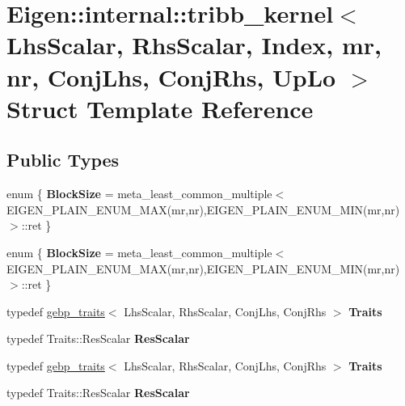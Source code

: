 \hypertarget{struct_eigen_1_1internal_1_1tribb__kernel}{}\section{Eigen\+:\+:internal\+:\+:tribb\+\_\+kernel$<$ Lhs\+Scalar, Rhs\+Scalar, Index, mr, nr, Conj\+Lhs, Conj\+Rhs, Up\+Lo $>$ Struct Template Reference}
\label{struct_eigen_1_1internal_1_1tribb__kernel}
\subsection*{Public Types}
\begin{DoxyCompactItemize}
\item 
\mbox{\label{struct_eigen_1_1internal_1_1tribb__kernel_a37de79324c1a304bdb5a3ef0e651e439}} 
enum \{ {\bfseries Block\+Size} = meta\+\_\+least\+\_\+common\+\_\+multiple$<$E\+I\+G\+E\+N\+\_\+\+P\+L\+A\+I\+N\+\_\+\+E\+N\+U\+M\+\_\+\+M\+AX(mr,nr),E\+I\+G\+E\+N\+\_\+\+P\+L\+A\+I\+N\+\_\+\+E\+N\+U\+M\+\_\+\+M\+IN(mr,nr)$>$\+:\+:ret
 \}
\item 
\mbox{\label{struct_eigen_1_1internal_1_1tribb__kernel_a8fb99bd3966c110455c00a2aa0cc304f}} 
enum \{ {\bfseries Block\+Size} = meta\+\_\+least\+\_\+common\+\_\+multiple$<$E\+I\+G\+E\+N\+\_\+\+P\+L\+A\+I\+N\+\_\+\+E\+N\+U\+M\+\_\+\+M\+AX(mr,nr),E\+I\+G\+E\+N\+\_\+\+P\+L\+A\+I\+N\+\_\+\+E\+N\+U\+M\+\_\+\+M\+IN(mr,nr)$>$\+:\+:ret
 \}
\item 
\mbox{\label{struct_eigen_1_1internal_1_1tribb__kernel_adfdbc6d9102ae5b765743360e77e7566}} 
typedef \hyperlink{class_eigen_1_1internal_1_1gebp__traits}{gebp\+\_\+traits}$<$ Lhs\+Scalar, Rhs\+Scalar, Conj\+Lhs, Conj\+Rhs $>$ {\bfseries Traits}
\item 
\mbox{\label{struct_eigen_1_1internal_1_1tribb__kernel_a7fc9a3aab6f0858799970d6dad0bc189}} 
typedef Traits\+::\+Res\+Scalar {\bfseries Res\+Scalar}
\item 
\mbox{\label{struct_eigen_1_1internal_1_1tribb__kernel_adfdbc6d9102ae5b765743360e77e7566}} 
typedef \hyperlink{class_eigen_1_1internal_1_1gebp__traits}{gebp\+\_\+traits}$<$ Lhs\+Scalar, Rhs\+Scalar, Conj\+Lhs, Conj\+Rhs $>$ {\bfseries Traits}
\item 
\mbox{\label{struct_eigen_1_1internal_1_1tribb__kernel_a7fc9a3aab6f0858799970d6dad0bc189}} 
typedef Traits\+::\+Res\+Scalar {\bfseries Res\+Scalar}
\end{DoxyCompactItemize}
